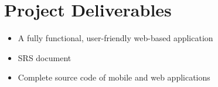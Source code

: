 \section{Project Deliverables}

\begin{itemize}
    \item A fully functional, user-friendly web-based application
    \item SRS document
    \item Complete source code of mobile and web applications
\end{itemize}